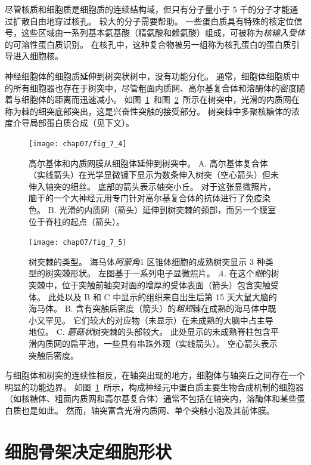 尽管核质和细胞质是细胞质的连续结构域，但只有分子量小于 5 千的分子才能通过扩散自由地穿过核孔。
较大的分子需要帮助。
一些蛋白质具有特殊的核定位信号，这些区域由一系列基本氨基酸（精氨酸和赖氨酸）组成，可被称为\textit{核输入受体}的可溶性蛋白质识别。
在核孔中，这种复合物被另一组称为核孔蛋白的蛋白质引导进入细胞核。


神经细胞体的细胞质延伸到树突状树中，没有功能分化。 
通常，细胞体细胞质中的所有细胞器也存在于树突中，尽管粗面内质网、高尔基复合体和溶酶体的密度随着与细胞体的距离而迅速减小。 
如图~\ref{fig:7_4}~和图~\ref{fig:7_5}~所示在树突中，光滑的内质网在称为棘的细突底部突出，这是兴奋性突触的接受部分。
树突棘中多聚核糖体的浓度介导局部蛋白质合成（见下文）。


\begin{figure}[htbp]
	\centering
	\texttt{[image: chap07/fig\_7\_4]}
	\caption{高尔基体和内质网膜从细胞体延伸到树突中。
		A. 高尔基体复合体（实线箭头）在光学显微镜下显示为数条伸入树突（空心箭头）但未伸入轴突的细丝。
		底部的箭头表示轴突小丘。
		对于这张显微照片，脑干的一个大神经元用专门针对高尔基复合体的抗体进行了免疫染色\cite{de1986heterogeneous}。
		B. 光滑的内质网（箭头）延伸到树突棘的颈部，而另一个膜室位于脊柱的起点（箭头）\cite{cooney2002endosomal}。}
	\label{fig:7_4}
\end{figure}


\begin{figure}[htbp]
	\centering
	\texttt{[image: chap07/fig\_7\_5]}
	\caption{树突棘的类型。
		海马体\textit{阿蒙角}1 区锥体细胞的成熟树突显示 3 种类型的树突棘形状。
		左图基于一系列电子显微照片\cite{harris1989dendritic,sorra1993occurrence}。
		\textit{A.} 在这个\textit{细}的树突棘中，位于突触前轴突对面的增厚的受体表面（箭头）包含突触受体。
		此处以及 B 和 C 中显示的组织来自出生后第 15 天大鼠大脑的海马体。
		B. 含有突触后密度（箭头）的\textit{粗短}棘在成熟的海马体中既小又罕见。
		它们较大的对应物（未显示）在未成熟的大脑中占主导地位。
		C. \textit{蘑菇状}树突棘的头部较大。
		此处显示的未成熟脊柱包含平滑内质网的扁平池，一些具有串珠外观（实线箭头）。
		空心箭头表示突触后密度。}
	\label{fig:7_5}
\end{figure}


与细胞体和树突的连续性相反，在轴突出现的地方，细胞体与轴突丘之间存在一个明显的功能边界。
如图~\ref{fig:7_4}~所示，构成神经元中蛋白质主要生物合成机制的细胞器（如核糖体、粗面内质网和高尔基复合体）通常不包括在轴突内，溶酶体和某些蛋白质也是如此。
然而，轴突富含光滑内质网、单个突触小泡及其前体膜。



\section{细胞骨架决定细胞形状}

